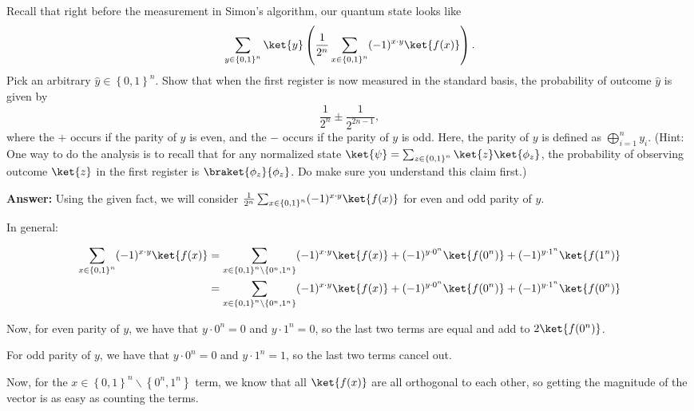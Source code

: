 \documentclass{article}
\newcommand{\set}[1]{{\left\{#1\right\}}}    %
\begin{document}
\begin{enumerate}
\begin{enumerate}
                Recall that right before the measurement in Simon's algorithm, our quantum state looks like
                \[
                  \sum_{y\in\set{0,1}^n}\ket{y}\left(\frac{1}{2^n}\sum_{x\in\set{0,1}^n}(-1)^{x\cdot y}\ket{f(x)}\right).
                \]
                Pick an arbitrary $\hat{y}\in\set{0,1}^n$. Show that when the first register is now measured in the standard basis, the probability of outcome $\hat{y}$ is given by
                \[
                  \frac{1}{2^n}\pm\frac{1}{2^{2n-1}},
                \]
                where the $+$ occurs if the parity of $y$ is even, and the $-$ occurs if the parity of $y$ is odd. Here, the parity of $y$ is defined as $\bigoplus_{i=1}^n y_i$. (Hint: One way to do the analysis is to recall that for any normalized state $\ket{\psi}=\sum_{z\in\set{0,1}^n}\ket{z}\ket{\phi_z}$, the probability of observing outcome $\ket{z}$ in the first register is $\braket{\phi_z}{\phi_z}$. Do make sure you understand this claim first.)

                \textbf{Answer:} Using the given fact, we will consider $\frac{1}{2^n}\sum_{x\in\set{0,1}^n}(-1)^{x\cdot y}\ket{f(x)}$ for even and odd parity of $y$.

                In general:

                $$\begin{aligned}
                    \sum_{x\in\set{0,1}^n}(-1)^{x\cdot y}\ket{f(x)} & = \sum_{x\in\set{0,1}^n\backslash \set{0^n,1^n}}(-1)^{x\cdot y}\ket{f(x)} + (-1)^{y\cdot 0^n}\ket{f(0^n)} + (-1)^{y\cdot 1^n}\ket{f(1^n)} \\
                                                                    & = \sum_{x\in\set{0,1}^n\backslash \set{0^n,1^n}}(-1)^{x\cdot y}\ket{f(x)} + (-1)^{y\cdot 0^n}\ket{f(0^n)} + (-1)^{y\cdot 1^n}\ket{f(0^n)} \\
                  \end{aligned}$$

                Now, for even parity of $y$, we have that $y\cdot 0^n=0$ and $y\cdot 1^n=0$, so the last two terms are equal and add to $2\ket{f(0^n)}$.

                For odd parity of $y$, we have that $y\cdot 0^n=0$ and $y\cdot 1^n=1$, so the last two terms cancel out.

                Now, for the $x\in\set{0,1}^n\backslash \set{0^n,1^n}$ term, we know that all $\ket{f(x)}$ are all orthogonal to each other, so getting the magnitude of the vector is as easy as counting the terms.


\end{enumerate}
\end{enumerate}
\end{document}
